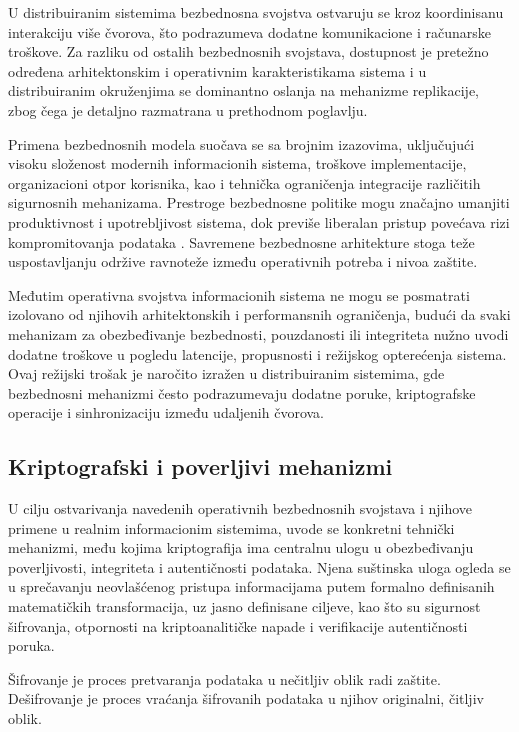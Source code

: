 U distribuiranim sistemima bezbednosna svojstva ostvaruju se kroz koordinisanu interakciju više čvorova, što podrazumeva dodatne komunikacione i računarske troškove. 
Za razliku od ostalih bezbednosnih svojstava, dostupnost je pretežno određena arhitektonskim i operativnim karakteristikama sistema i u distribuiranim okruženjima se dominantno oslanja na mehanizme replikacije, zbog čega je detaljno razmatrana u prethodnom poglavlju.

Primena bezbednosnih modela suočava se sa brojnim izazovima, uključujući visoku složenost modernih informacionih sistema, troškove implementacije, organizacioni otpor korisnika, kao i tehnička ograničenja integracije različitih sigurnosnih mehanizama. Prestroge bezbednosne politike mogu značajno umanjiti produktivnost i upotrebljivost sistema, dok previše liberalan pristup povećava rizi kompromitovanja podataka \cite{di2022getting}. Savremene bezbednosne arhitekture stoga teže uspostavljanju održive ravnoteže između operativnih potreba i nivoa zaštite.

Međutim operativna svojstva informacionih sistema ne mogu se posmatrati izolovano od njihovih arhitektonskih i performansnih ograničenja, budući da svaki mehanizam za obezbeđivanje bezbednosti, pouzdanosti ili integriteta nužno uvodi dodatne troškove u pogledu latencije, propusnosti i režijskog opterećenja sistema. Ovaj režijski trošak je naročito izražen u distribuiranim sistemima, gde bezbednosni mehanizmi često podrazumevaju dodatne poruke, kriptografske operacije i sinhronizaciju između udaljenih čvorova.

\subsection{Kriptografski i poverljivi mehanizmi}
U cilju ostvarivanja navedenih operativnih bezbednosnih svojstava i njihove primene u realnim informacionim sistemima, uvode se konkretni tehnički mehanizmi, među kojima kriptografija ima centralnu ulogu u obezbeđivanju poverljivosti, integriteta i autentičnosti podataka. Njena suštinska uloga ogleda se u sprečavanju neovlašćenog pristupa informacijama putem formalno definisanih matematičkih transformacija, uz jasno definisane ciljeve, kao što su sigurnost šifrovanja, otpornosti na kriptoanalitičke napade i verifikacije autentičnosti poruka.

\begin{definicija}
Šifrovanje  je proces pretvaranja podataka u nečitljiv oblik radi zaštite. Dešifrovanje  je proces vraćanja šifrovanih podataka u njihov originalni, čitljiv oblik.
\end{definicija}

